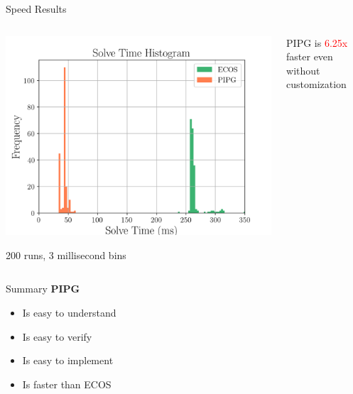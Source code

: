 \documentclass[aspectratio=169]{beamer}
\begin{document}
\begin{frame}{Speed Results}


    \begin{columns}[T]
        \begin{column}{.6\textwidth}
            \includegraphics[width=\linewidth]{img/solve_speed.png}\begin{center}
                {200 runs, 3 millisecond bins}
            \end{center}
        \end{column}
        \begin{column}{.4\textwidth}
            \begin{center}

                \vspace{0.5cm}

            \end{center} 
            
            PIPG is \textcolor{red}{6.25x} faster even without customization

        \end{column}
    \end{columns}
\end{frame}
\begin{frame}{Summary}
    \textbf{PIPG}
    \begin{itemize}
        \item Is easy to understand
        \item Is easy to verify
        \item Is easy to implement
        \item Is faster than ECOS
    \end{itemize}
    
\end{frame}
\end{document}
